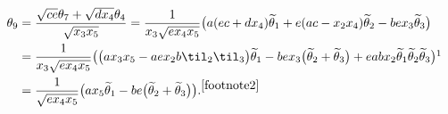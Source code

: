 {\begin{align*}
 \theta_9 &= \frac{\sqrt{ce} \theta_7 + \sqrt{dx_4} \theta_4}{\sqrt{x_3x_5}}
 = \frac{1}{x_3 \sqrt{ex_4x_5}} \big( a(ec+dx_4) {\widetilde{\theta}_1} + e(ac-x_2x_4) \widetilde{\theta}_2 - be x_3 \widetilde{\theta}_3 \big) \\
 &= {\frac{1}{x_3 \sqrt{ex_4x_5}} \big( \big(a x_3x_5 - aex_2b \til_2\til_3 \big) \widetilde{\theta}_1 - bex_3 \big(\widetilde{\theta}_2 + \widetilde{\theta}_3\big) + eabx_2 \widetilde{\theta}_1 \widetilde{\theta}_2 \widetilde{\theta}_3 \big) }\footnotemark \\
 &= {\frac{1}{\sqrt{ex_4x_5}} \big( a x_5 \widetilde{\theta}_1 - be \big(\widetilde{\theta}_2 + \widetilde{\theta}_3\big) \big). }{}^{\ref{footnote2}}
\end{align*}

}
